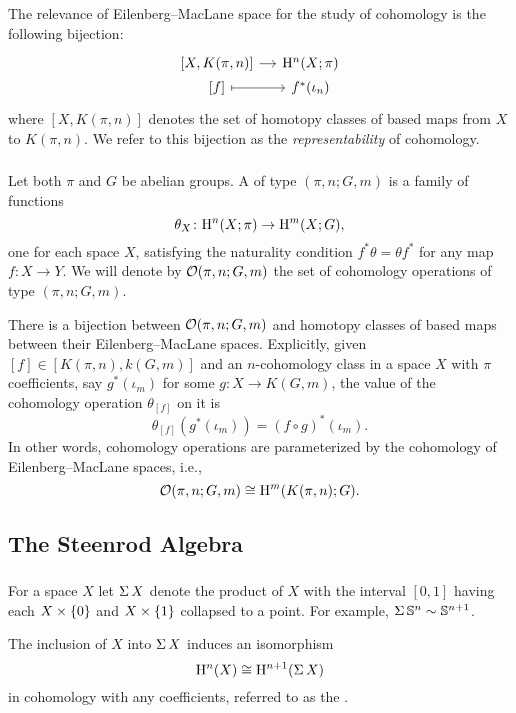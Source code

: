 The relevance of Eilenberg--MacLane space for the study of cohomology is the following bijection:
\[
\begin{tikzcd}[column sep=small, row sep=0]
	{[X, K(\pi, n)]} \rar & \rH^n(X; \pi) \\
	{[f]} \rar[maps to] & f^*(\iota_n)
\end{tikzcd}
\]
where $[X, K(\pi, n)]$ denotes the set of homotopy classes of based maps from $X$ to $K(\pi, n)$.
We refer to this bijection as the \textit{representability} of cohomology.

\subsubsection{} Let both $\pi$ and $G$ be abelian groups.
A  of type $(\pi, n; G, m)$ is a family of functions
\[
\theta_X \colon \mathrm{H}^n(X; \pi) \rightarrow \mathrm{H}^m(X; G),
\]
one for each space $X$, satisfying the naturality condition $f^* \theta = \theta f^*$ for any map $f \colon X \rightarrow Y$.
We will denote by $\mathcal{O}(\pi, n; G,m)$ the set of cohomology operations of type $(\pi, n; G,m)$.

There is a bijection between $\mathcal{O}(\pi, n; G,m)$ and homotopy classes of based maps between their Eilenberg--MacLane spaces.
Explicitly, given $[f] \in [K(\pi,n), k(G,m)]$ and an $n$-cohomology class in a space $X$ with $\pi$ coefficients, say $g^*(\iota_m)$ for some $g \colon X \to K(G, m)$, the value of the cohomology operation $\theta_{[f]}$ on it is
\[
\theta_{[f]}(g^*(\iota_m)) = (f \circ g)^*(\iota_m).
\]
In other words, cohomology operations are parameterized by the cohomology of Eilenberg--MacLane spaces, i.e.,
\[
\mathcal{O}(\pi, n; G,m) \cong \mathrm{H}^m(K(\pi,n); G).
\]

\subsection{The Steenrod Algebra}\label{ss:steenrod}

\subsubsection{} For a space $X$ let $\operatorname{\Sigma} X$ denote the product of $X$ with the interval $[0,1]$ having each $X \times \{0\}$ and $X \times \{1\}$ collapsed to a point.
For example, $\operatorname{\Sigma} \mathbb{S}^n \sim \mathbb{S}^{n+1}$.

The inclusion of $X$ into $\operatorname{\Sigma} X$ induces an isomorphism
\[
\mathrm{H}^n(X) \cong \mathrm{H}^{n+1}(\operatorname{\Sigma} X)
\]
in cohomology with any coefficients, referred to as the .

